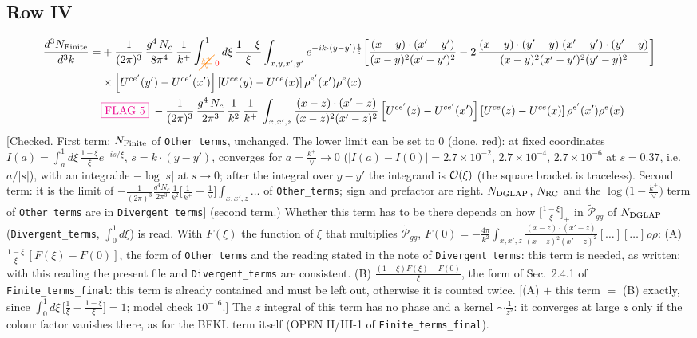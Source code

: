 \documentclass[9pt]{article}
\numberwithin{equation}{section}
\begin{document}
\subsection{Row IV}
\begin{align}
\frac{d^{3}N_{\rm Finite}}{d^{3}k}= &  +\frac{1}{(2\pi)^{3}}\,\frac{g^{4}\,N_{c}}{8\pi^{4}}\,\frac{1}{k^{+}}\int_{{\color{orange}\cancel{\frac{k^{+}}{\vee}}}\,{\color{red}0}}^{1}d\xi\,\frac{1-\xi}{\xi}\int_{x,y,x',y'}e^{-ik\cdot(y-y')\frac{1}{\xi}}\bigg[\frac{(x-y)\cdot(x'-y')}{(x-y)^{2}(x'-y')^{2}}-2\,\frac{(x-y)\cdot(y'-y)\;(x'-y')\cdot(y'-y)}{(x-y)^{2}(x'-y')^{2}(y'-y)^{2}}\bigg]\notag\\
&\times\left[U^{ce'}(y') - U^{ce'}(x')\right]\left[U^{ce}(y) - U^{ce}(x)\right]\rho^{e'}(x')\rho^{e}(x)\notag \\ & {\color{magenta}\fbox{FLAG 5}}\;-\frac{1}{(2\pi)^{3}}\,\frac{g^{4}\,N_{c}}{2\pi^{3}}\,\frac{1}{k^{2}}\,\frac{1}{k^{+}}\,\int_{x,x',z}\frac{(x-z)\cdot(x'-z)}{(x-z)^{2}(x'-z)^{2}}\left[U^{ce'}(z) - U^{ce'}(x')\right]\left[U^{ce}(z) - U^{ce}(x)\right]\rho^{e'}(x')\rho^{e}(x)
\end{align} {\color{red}[Checked. First term: $N_{\rm Finite}$ of \texttt{Other\_terms}, unchanged. The lower limit can be set to $0$ (done, red): at fixed coordinates $I(a)=\int_{a}^{1}d\xi\,\frac{1-\xi}{\xi}e^{-is/\xi}$, $s=k\cdot(y-y')$, converges for $a=\frac{k^{+}}{\vee}\to0$ ($|I(a)-I(0)|=2.7\times10^{-2}$, $2.7\times10^{-4}$, $2.7\times10^{-6}$ at $s=0.37$, i.e.\ $a/|s|$), with an integrable $-\log|s|$ at $s\to0$; after the integral over $y-y'$ the integrand is ${\cal O}(\xi)$ (the square bracket is traceless). Second term: it is the limit of $-\frac{1}{(2\pi)^{3}}\frac{g^{4}N_{c}}{2\pi^{3}}\frac{1}{k^{2}}\big[\frac{1}{k^{+}}-\frac{1}{\vee}\big]\int_{x,x',z}\dots$ of \texttt{Other\_terms}; sign and prefactor are right. $N_{\rm DGLAP}$, $N_{\rm RC}$ and the $\log\big(1-\frac{k^{+}}{\vee}\big)$ term of \texttt{Other\_terms} are in \texttt{Divergent\_terms}]} {\color{magenta} (second term.) Whether this term has to be there depends on how $\big[\frac{1-\xi}{\xi}\big]_{+}$ in $\widetilde{\mathcal{P}}_{gg}$ of $N_{\rm DGLAP}$ (\texttt{Divergent\_terms}, $\int_{0}^{1}d\xi$) is read. With $F(\xi)$ the function of $\xi$ that multiplies $\widetilde{\mathcal{P}}_{gg}$, $F(0)=-\frac{4\pi}{k^{2}}\int_{x,x',z}\frac{(x-z)\cdot(x'-z)}{(x-z)^{2}(x'-z)^{2}}[\dots][\dots]\rho\rho$: (A) $\frac{1-\xi}{\xi}\,[F(\xi)-F(0)]$, the form of \texttt{Other\_terms} and the reading stated in the note of \texttt{Divergent\_terms}: this term is needed, as written; with this reading the present file and \texttt{Divergent\_terms} are consistent. (B) $\frac{(1-\xi)F(\xi)-F(0)}{\xi}$, the form of Sec.~2.4.1 of \texttt{Finite\_terms\_final}: this term is already contained and must be left out, otherwise it is counted twice. [(A) $+$ this term $=$ (B) exactly, since $\int_{0}^{1}d\xi\,\big[\frac{1}{\xi}-\frac{1-\xi}{\xi}\big]=1$; model check $10^{-16}$.] The $z$ integral of this term has no phase and a kernel $\sim\frac{1}{z^{2}}$: it converges at large $z$ only if the colour factor vanishes there, as for the BFKL term itself (OPEN II/III-1 of \texttt{Finite\_terms\_final}).}\par\noindent
\end{document}
